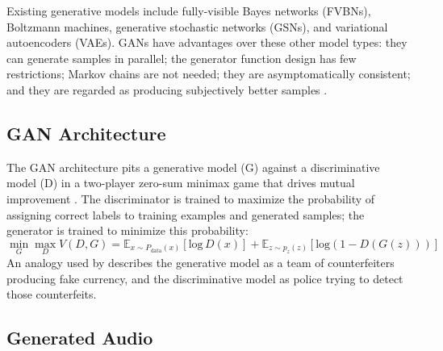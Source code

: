 \documentclass[a4paper, dvipsnames, titlepage]{article}
\begin{document}
Existing generative models include fully-visible Bayes networks (FVBNs), Boltzmann machines, generative stochastic networks (GSNs), and variational autoencoders (VAEs).
GANs have advantages over these other model types: they can generate samples in parallel; the generator function design has few restrictions; Markov chains are not needed; they are asymptomatically consistent; and they are regarded as producing subjectively better samples \citep{2017arXiv170100160G}.

\subsection{GAN Architecture}

The GAN architecture pits a generative model (G) against a discriminative model (D) in a two-player zero-sum minimax game that drives mutual improvement \citep{2014arXiv1406.2661G}.
The discriminator is trained to maximize the probability of assigning correct labels to training examples and generated samples; the generator is trained to minimize this probability:
\newline
%
\begin{equation}
  \min_{G} \max_{D} V(D,G) = \mathbb{E}_{x \sim P_\mathrm{data}(x)}[\mathrm{log}\,D(x)] + \mathbb{E}_{z \sim p_z(z)}[\mathrm{log} (1 - D(G(z)))]
\end{equation}
%
\newline
An analogy used by \citeauthor{2014arXiv1406.2661G} describes the generative model as a team of counterfeiters producing fake currency, and the discriminative model as police trying to detect those counterfeits.

\subsection{Generated Audio}
\end{document}
